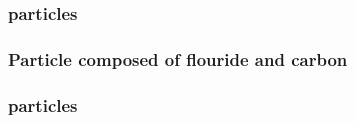 \subsubsection{ particles}
\todo{}

\subsubsection{Particle composed of flouride and carbon}

\subsubsection{ particles}
\todo{}

\begin{comment}
\todo{Fiks dette et sted.}
In order to observe correlations between the occurrence of voids and microvoids on the as-received substrate B to the occurrence of polishing grit after polish and etch, the sample Pearson correlation coefficient was determined. \todo{Skriv inn formel. Og regn ut correlation.} If there are one dataset $x_i \in \{x_1, ..., x_n\}$ containing $n$ values and another dataset $y_i \in \{y_1, ..., y_n\}$ containing $n$ values, then the sample Pearson correlation coefficient is defined as

\begin{equation}\label{eq:pearson_correlation_coefficient}
    r = \frac{
        n\sum_{i=1}^nx_iy_i - \sum_{i=1}^n x_i \sum_{i=1}^n y_i
        }{
        \sqrt{n\sum_{i=1}^n x_i^2 - \parentheses{\sum_{i=1}^n x_i}^2}\sqrt{n\sum_{i=1}^n y_i^2 - \parentheses{\sum_{i=1}^n y_i}^2} },
\end{equation}
where $\avg{x}=\frac{1}{n}\sum_{i=1}^n x_i$ is the sample mean; and analogously for $\avg{y}$. 

%
\end{comment}

